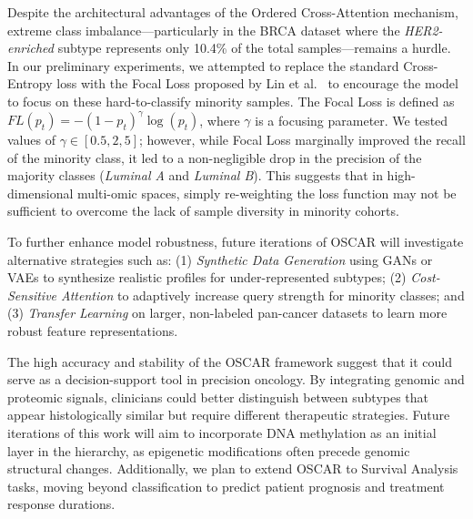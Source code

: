 \documentclass[lettersize,journal]{IEEEtran}
\begin{document}
Despite the architectural advantages of the Ordered Cross-Attention mechanism, extreme class imbalance—particularly in the BRCA dataset where the \textit{HER2-enriched} subtype represents only 10.4\% of the total samples—remains a hurdle. In our preliminary experiments, we attempted to replace the standard Cross-Entropy loss with the Focal Loss proposed by Lin et al.~\cite{FocalLoss2017} to encourage the model to focus on these hard-to-classify minority samples. The Focal Loss is defined as $FL(p_t) = -(1-p_t)^\gamma \log(p_t)$, where $\gamma$ is a focusing parameter. We tested values of $\gamma \in [0.5, 2, 5]$; however, while Focal Loss marginally improved the recall of the minority class, it led to a non-negligible drop in the precision of the majority classes (\textit{Luminal A} and \textit{Luminal B}). This suggests that in high-dimensional multi-omic spaces, simply re-weighting the loss function may not be sufficient to overcome the lack of sample diversity in minority cohorts.

To further enhance model robustness, future iterations of OSCAR will investigate alternative strategies such as: (1) \textit{Synthetic Data Generation} using GANs or VAEs to synthesize realistic profiles for under-represented subtypes; (2) \textit{Cost-Sensitive Attention} to adaptively increase query strength for minority classes; and (3) \textit{Transfer Learning} on larger, non-labeled pan-cancer datasets to learn more robust feature representations.

The high accuracy and stability of the OSCAR framework suggest that it could serve as a decision-support tool in precision oncology. By integrating genomic and proteomic signals, clinicians could better distinguish between subtypes that appear histologically similar but require different therapeutic strategies. Future iterations of this work will aim to incorporate DNA methylation as an initial layer in the hierarchy, as epigenetic modifications often precede genomic structural changes. Additionally, we plan to extend OSCAR to Survival Analysis tasks, moving beyond classification to predict patient prognosis and treatment response durations.



% 
% 

 

\end{document}

